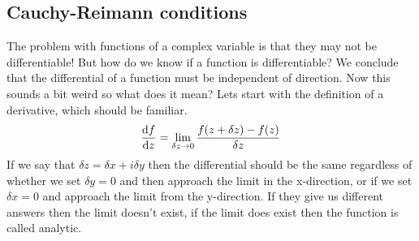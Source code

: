 \subsection{Cauchy-Reimann conditions}
The problem with functions of a complex variable is that they may not be differentiable!
 But how do we know if a function is differentiable? 
 We conclude that the differential of a function must be independent of direction. 
 Now this sounds a bit weird so what does it mean?
  Lets start with the definition of a derivative, which should be familiar.
\begin{equation*}
\frac{\mathop{}\!\mathrm{d} f}{\mathop{}\!\mathrm{d} z}=\lim_{\delta z\to 0}\frac{f(z+\delta z)-f(z)}{\delta z}
\end{equation*}
If we say that $\delta z=\delta x + i\delta y$ then the differential should be the same regardless of whether we set $\delta y=0$ and then approach the limit in the x-direction, or if we set $\delta x=0$ and approach the limit from the y-direction.
 If they give us different answers then the limit doesn't exist, if the limit does exist then the function is called analytic.